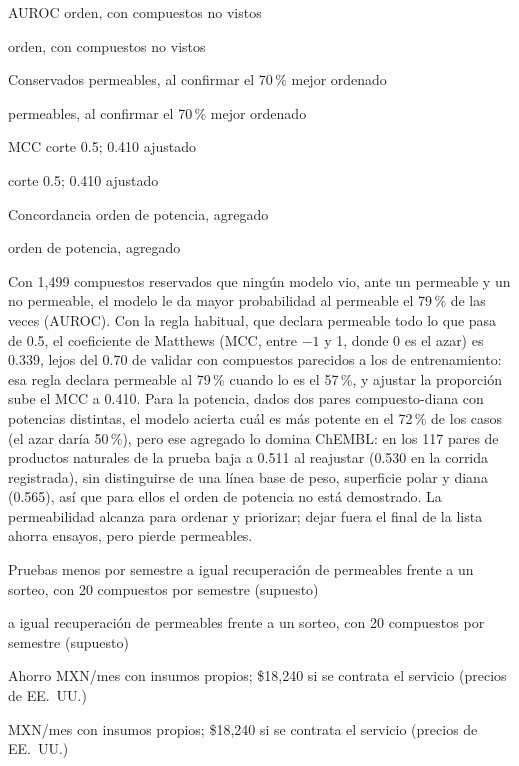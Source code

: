 \documentclass[letterpaper,11pt]{article}
\newlength{\alturacifra}\setlength{\alturacifra}{2.3cm}
\newcommand{\cifra}[5]{%
  \begingroup\setlength{\fboxsep}{5pt}%
  \colorbox{#1}{\parbox[t][\alturacifra][t]{\dimexpr\linewidth-2\fboxsep\relax}{%
    \setstretch{1}\raggedright\color{#2}{\Large\bfseries #3}\par
    #4%
    \ifx\relax#5\relax\else\par{\footnotesize #5}\fi}}%
  \endgroup}
\newcommand{\cifragris}[4]{\cifra{black!8}{black}{#1}{#2}{#3}}
\begin{document}
\medskip
\noindent
\setlength{\alturacifra}{2.3cm}
\begin{minipage}[t]{0.235\linewidth}\cifragris{0.793}{AUROC}{orden, con compuestos no vistos}{}\end{minipage}\hfill
\begin{minipage}[t]{0.235\linewidth}\cifragris{85\,\%}{Conservados}{permeables, al confirmar el 70\,\% mejor ordenado}{}\end{minipage}\hfill
\begin{minipage}[t]{0.235\linewidth}\cifragris{0.339}{MCC}{corte 0.5; 0.410 ajustado}{}\end{minipage}\hfill
\begin{minipage}[t]{0.235\linewidth}\cifragris{0.720}{Concordancia}{orden de potencia, agregado}{}\end{minipage}
\medskip

Con 1,499 compuestos reservados que ningún modelo vio, ante un permeable y un no permeable, el modelo le da mayor probabilidad al permeable el 79\,\% de las veces (AUROC). Con la regla habitual, que declara permeable todo lo que pasa de 0.5, el coeficiente de Matthews (MCC, entre $-1$ y 1, donde 0 es el azar) es 0.339, lejos del 0.70 de validar con compuestos parecidos a los de entrenamiento: esa regla declara permeable al 79\,\% cuando lo es el 57\,\%, y ajustar la proporción sube el MCC a 0.410. Para la potencia, dados dos pares compuesto-diana con potencias distintas, el modelo acierta cuál es más potente en el 72\,\% de los casos (el azar daría 50\,\%), pero ese agregado lo domina ChEMBL: en los 117 pares de productos naturales de la prueba baja a 0.511 al reajustar (0.530 en la corrida registrada), sin distinguirse de una línea base de peso, superficie polar y diana (0.565), así que para ellos el orden de potencia no está demostrado. La permeabilidad alcanza para ordenar y priorizar; dejar fuera el final de la lista ahorra ensayos, pero pierde permeables.

\medskip
\noindent
\setlength{\alturacifra}{2.2cm}
\begin{minipage}[t]{0.485\linewidth}\cifragris{3}{Pruebas menos por semestre}{a igual recuperación de permeables frente a un sorteo, con 20 compuestos por semestre (supuesto)}{}\end{minipage}\hfill
\begin{minipage}[t]{0.485\linewidth}\cifragris{\$3,270}{Ahorro}{MXN/mes con insumos propios; \$18,240 si se contrata el servicio (precios de EE.~UU.)}{}\end{minipage}
\end{document}
